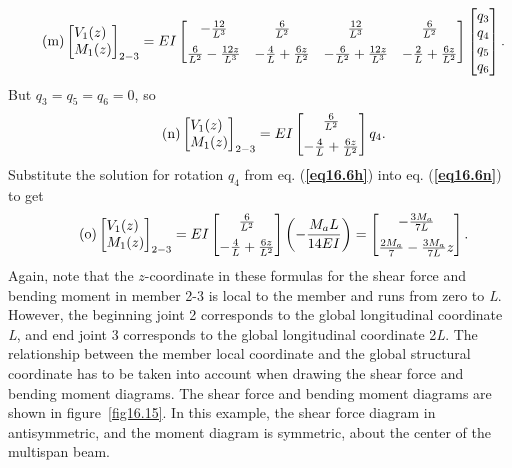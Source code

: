 \documentclass{AeroStructure-ERJohnson}
\begin{document}
\begin{example}
\begin{align}\label{eq16.6m}\tag{m}
\left[\begin{array}{@{}l@{}}V_{1}(z) \\M_{1}(z)\end{array}\right]_{2-3}=E I\left[\begin{array}{@{}cccc@{}}-\frac{12}{L^{3}} & \frac{6}{L^{2}} & \frac{12}{L^{3}} & \frac{6}{L^{2}} \\[6pt]\frac{6}{L^{2}}-\frac{12 z}{L^{3}} & -\frac{4}{L}+\frac{6 z}{L^{2}} & -\frac{6}{L^{2}}+\frac{12 z}{L^{3}} & -\frac{2}{L}+\frac{6 z}{L^{2}}\end{array}\right]\left[\begin{array}{@{}l@{}}q_{3} \\q_{4} \\q_{5} \\q_{6}\end{array}\right].
\end{align}
But $q_{3}=q_{5}=q_{6}=0$, so
\begin{align}\label{eq16.6n}\tag{n}
\left[\begin{array}{@{}l@{}}V_{1}(z) \\M_{1}(z)\end{array}\right]_{2-3}=E I\left[\begin{array}{@{}c@{}}\frac{6}{L^{2}} \\[6pt]-\frac{4}{L}+\frac{6 z}{L^{2}}\end{array}\right] q_{4}.
\end{align}
Substitute the solution for rotation $q_{4}$ from eq. (\textbf{\ref{eq16.6h}}) into eq. (\textbf{\ref{eq16.6n}}) to get
\begin{align}\label{eq16.6o}\tag{o}
\left[\begin{array}{@{}l@{}}V_{1}(z) \\M_{1}(z)\end{array}\right]_{2-3}=E I\left[\begin{array}{@{}c@{}}\frac{6}{L^{2}} \\[6pt]-\frac{4}{L}+\frac{6 z}{L^{2}}\end{array}\right]\left(-\frac{M_{a} L}{14 E I}\right)=\left[\begin{array}{@{}c@{}}-\frac{3 M_{a}}{7 L} \\[6pt]\frac{2 M_{a}}{7}-\frac{3 M_{a}}{7 L} z\end{array}\right].
\end{align}
Again, note that the $z$-coordinate in these formulas for the shear force and bending moment in member 2-3 is local to the member and runs from zero to \textit{L}. However, the beginning joint 2 corresponds to the global longitudinal coordinate \textit{L}, and end joint 3 corresponds to the global longitudinal coordinate 2\textit{L}. The relationship between the member local coordinate and the global structural coordinate has to be taken into account when drawing the shear force and bending moment diagrams. The shear force and bending moment diagrams are shown in figure~\ref{fig16.15}. In this example, the shear force diagram in antisymmetric, and the moment diagram is symmetric, about the center of the multispan beam.



\end{example}
\end{document}

